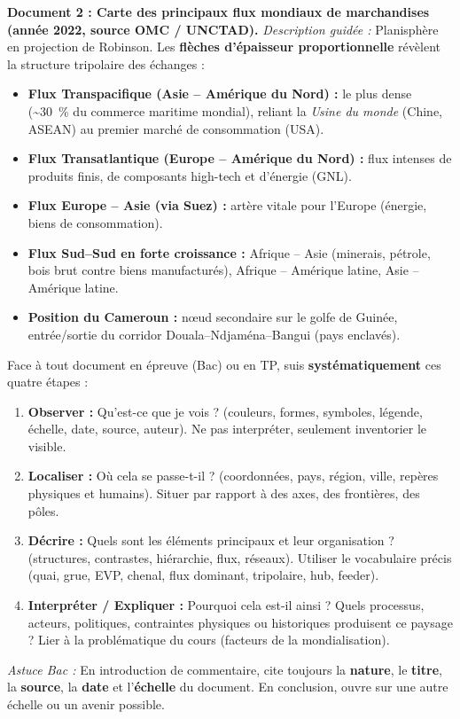 \documentclass[11pt]{article}
\begin{document}
\textbf{Document 2 : Carte des principaux flux mondiaux de marchandises (année 2022, source OMC / UNCTAD).}
\emph{Description guidée :} Planisphère en projection de Robinson. Les \textbf{flèches d'épaisseur proportionnelle} révèlent la structure tripolaire des échanges :
\begin{itemize}
    \item \textbf{Flux Transpacifique (Asie – Amérique du Nord) :} le plus dense (\textasciitilde \SI{30}{\%} du commerce maritime mondial), reliant la \emph{Usine du monde} (Chine, ASEAN) au premier marché de consommation (USA).
    \item \textbf{Flux Transatlantique (Europe – Amérique du Nord) :} flux intenses de produits finis, de composants high-tech et d'énergie (GNL).
    \item \textbf{Flux Europe – Asie (via Suez) :} artère vitale pour l'Europe (énergie, biens de consommation).
    \item \textbf{Flux Sud–Sud en forte croissance :} Afrique – Asie (minerais, pétrole, bois brut contre biens manufacturés), Afrique – Amérique latine, Asie – Amérique latine.
    \item \textbf{Position du Cameroun :} nœud secondaire sur le golfe de Guinée, entrée/sortie du corridor Douala–Ndjaména–Bangui (pays enclavés).
\end{itemize}

\begin{methode}
Face à tout document en épreuve (Bac) ou en TP, suis \textbf{systématiquement} ces quatre étapes :
\begin{enumerate}
    \item \textbf{Observer :} Qu'est-ce que je vois ? (couleurs, formes, symboles, légende, échelle, date, source, auteur). Ne pas interpréter, seulement inventorier le visible.
    \item \textbf{Localiser :} Où cela se passe-t-il ? (coordonnées, pays, région, ville, repères physiques et humains). Situer par rapport à des axes, des frontières, des pôles.
    \item \textbf{Décrire :} Quels sont les éléments principaux et leur organisation ? (structures, contrastes, hiérarchie, flux, réseaux). Utiliser le vocabulaire précis (quai, grue, EVP, chenal, flux dominant, tripolaire, hub, feeder).
    \item \textbf{Interpréter / Expliquer :} Pourquoi cela est-il ainsi ? Quels processus, acteurs, politiques, contraintes physiques ou historiques produisent ce paysage ? Lier à la problématique du cours (facteurs de la mondialisation).
\end{enumerate}
\emph{Astuce Bac :} En introduction de commentaire, cite toujours la \textbf{nature}, le \textbf{titre}, la \textbf{source}, la \textbf{date} et l'\textbf{échelle} du document. En conclusion, ouvre sur une autre échelle ou un avenir possible.
\end{methode}
\end{document}
